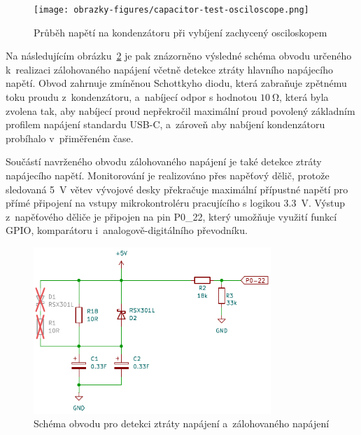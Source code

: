 \begin{figure}[h]
    \centering
    \texttt{[image: obrazky-figures/capacitor-test-osciloscope.png]}
    
    \caption{Průběh napětí na kondenzátoru při vybíjení zachycený osciloskopem}
    \label{fig:test-capacitors-osciloscope}
\end{figure}


Na následujícím obrázku~\ref{fig:backup-power} je pak znázorněno výsledné schéma obvodu určeného k~realizaci zálohovaného napájení včetně detekce ztráty hlavního napájecího napětí. Obvod zahrnuje zmíněnou Schottkyho diodu, která zabraňuje zpětnému toku proudu z~kondenzátoru, a~nabíjecí odpor s hodnotou $\SI{10}{\ohm}$, která byla zvolena tak, aby nabíjecí proud nepřekročil maximální proud povolený základním profilem napájení standardu USB-C, a~zároveň aby nabíjení kondenzátoru probíhalo v~přiměřeném čase.

\newpage

Součástí navrženého obvodu zálohovaného napájení je také detekce ztráty napájecího napětí. Monitorování je realizováno přes napěťový dělič, protože sledovaná \SI{5}{\volt} větev vývojové desky překračuje maximální přípustné napětí pro přímé připojení na vstupy mikrokontroléru pracujícího s logikou \SI{3.3}{\volt}. Výstup z~napěťového děliče je připojen na pin P0\_22, který umožňuje využití funkcí GPIO, komparátoru i~analogově-digitálního převodníku.

\begin{figure}[h]
    \centering
    \includegraphics[width=0.80\textwidth]{obrazky-figures/backup-power.pdf}
    
    \caption{Schéma obvodu pro detekci ztráty napájení a~zálohovaného napájení}
    \label{fig:backup-power}
\end{figure}

